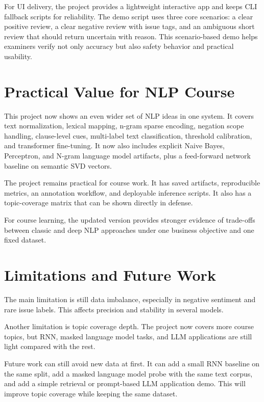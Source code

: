\documentclass[12pt,a4paper]{article}
\begin{document}
For UI delivery, the project provides a lightweight interactive app and keeps CLI fallback scripts for reliability. The demo script uses three core scenarios: a clear positive review, a clear negative review with issue tags, and an ambiguous short review that should return uncertain with reason. This scenario-based demo helps examiners verify not only accuracy but also safety behavior and practical usability.

\section{Practical Value for NLP Course}
This project now shows an even wider set of NLP ideas in one system. It covers text normalization, lexical mapping, n-gram sparse encoding, negation scope handling, clause-level cues, multi-label text classification, threshold calibration, and transformer fine-tuning. It now also includes explicit Naive Bayes, Perceptron, and N-gram language model artifacts, plus a feed-forward network baseline on semantic SVD vectors.

The project remains practical for course work. It has saved artifacts, reproducible metrics, an annotation workflow, and deployable inference scripts. It also has a topic-coverage matrix that can be shown directly in defense.

For course learning, the updated version provides stronger evidence of trade-offs between classic and deep NLP approaches under one business objective and one fixed dataset.

\section{Limitations and Future Work}
The main limitation is still data imbalance, especially in negative sentiment and rare issue labels. This affects precision and stability in several models.

Another limitation is topic coverage depth. The project now covers more course topics, but RNN, masked language model tasks, and LLM applications are still light compared with the rest.

Future work can still avoid new data at first. It can add a small RNN baseline on the same split, add a masked language model probe with the same text corpus, and add a simple retrieval or prompt-based LLM application demo. This will improve topic coverage while keeping the same dataset.
\end{document}

